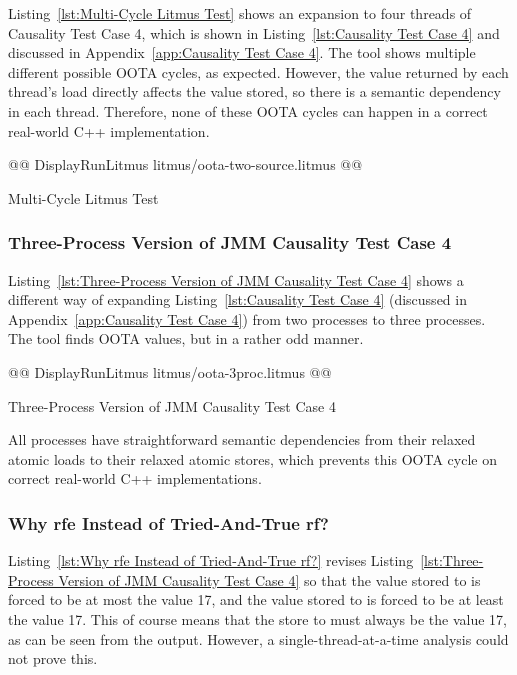 \documentclass[10]{article}
\begin{document}
Listing~\ref{lst:Multi-Cycle Litmus Test}
shows an expansion to four threads of Causality Test Case 4, which is shown in
Listing~\ref{lst:Causality Test Case 4}
and discussed in
Appendix~\ref{app:Causality Test Case 4}.
The  tool shows multiple different possible OOTA cycles,
as expected.
However, the value returned by each thread's load directly affects the
value stored, so there is a semantic dependency in each thread.
Therefore, none of these OOTA cycles can happen in a correct real-world
C++ implementation.

\begin{listing}[tbp]
@@ DisplayRunLitmus litmus/oota-two-source.litmus @@
\caption{Multi-Cycle Litmus Test}
\label{lst:Multi-Cycle Litmus Test}
\end{listing}

\subsubsection{Three-Process Version of JMM Causality Test Case 4}
\label{app:Three-Process Version of JMM Causality Test Case 4}

Listing~\ref{lst:Three-Process Version of JMM Causality Test Case 4}
shows a different way of expanding
Listing~\ref{lst:Causality Test Case 4}
(discussed in
Appendix~\ref{app:Causality Test Case 4})
from two processes to three processes.
The  tool finds OOTA values, but in a rather odd manner.

\begin{listing}[tbp]
@@ DisplayRunLitmus litmus/oota-3proc.litmus @@
\caption{Three-Process Version of JMM Causality Test Case 4}
\label{lst:Three-Process Version of JMM Causality Test Case 4}
\end{listing}

All processes have straightforward semantic dependencies from their
relaxed atomic loads to their relaxed atomic stores, which prevents this
OOTA cycle on correct real-world C++ implementations.

\subsubsection{Why rfe Instead of Tried-And-True rf?}
\label{app:Why rfe Instead of Tried-And-True rf?}

Listing~\ref{lst:Why rfe Instead of Tried-And-True rf?}
revises
Listing~\ref{lst:Three-Process Version of JMM Causality Test Case 4}
so that the value stored to  is forced to be at most the
value 17, and the value stored to  is forced to be at least the
value 17.
This of course means that the store to  must always be the value
17, as can be seen from the  output.
However, a single-thread-at-a-time analysis could not prove this.
\end{document}
